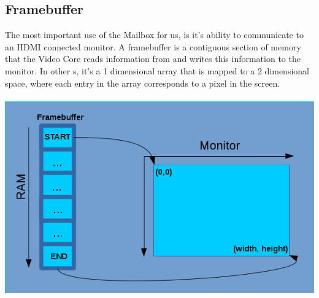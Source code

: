 \documentclass[12pt, svgnames]{book}
\begin{document}
\newpage
\subsection{Framebuffer}

The most important use of the Mailbox for us, is it's ability to communicate to an HDMI connected monitor. A framebuffer is a contiguous section of memory that the Video Core reads information from and writes this information to the monitor. In other s, it's a 1 dimensional array that is mapped to a 2 dimensional space, where each entry in the array corresponds to a pixel in the screen.
\\~\\
\centering
\includegraphics[scale=1]{FramebufferDiagram.png}
\end{document}
